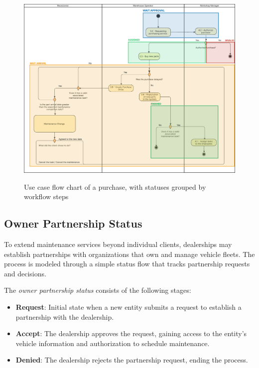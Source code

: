 \begin{figure}[h]
  \caption{Use case flow chart of a purchase, with statuses grouped by workflow steps}
  \centering
  \includegraphics[width=\textwidth]{figs/Status/Purchase/UseCaseStatus}
  \label{fig:purchaseUseCase}
\end{figure}


\subsection{Owner Partnership Status} 

To extend maintenance services beyond individual clients, dealerships may establish partnerships with organizations that own and manage vehicle fleets. The process is modeled through a simple status flow that tracks partnership requests and decisions.

The \textit{owner partnership status} consists of the following stages:

\begin{itemize}
\item \textbf{Request}: Initial state when a new entity submits a request to establish a partnership with the dealership.
\item \textbf{Accept}: The dealership approves the request, gaining access to the entity's vehicle information and authorization to schedule maintenance.
\item \textbf{Denied}: The dealership rejects the partnership request, ending the process.
\end{itemize}

